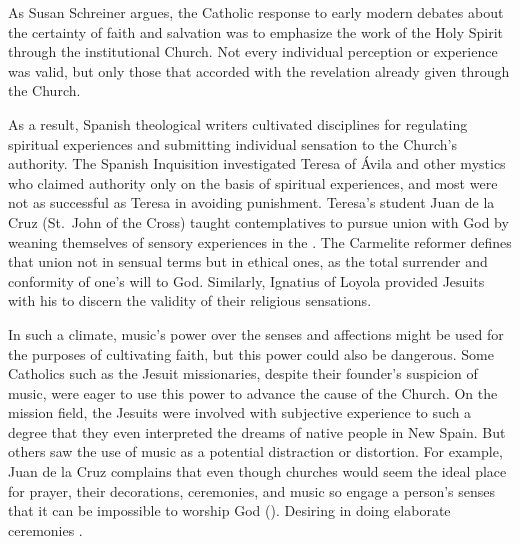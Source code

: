 As Susan Schreiner argues, the Catholic response to early modern debates about the certainty of faith and salvation was to emphasize the work of the Holy Spirit through the institutional Church.%
    \Autocite[131--208]{Schreiner:Certainty}
Not every individual perception or experience was valid, but only those that accorded with the revelation already given through the Church.

As a result, Spanish theological writers cultivated disciplines for regulating spiritual experiences and submitting individual sensation to the Church's authority.
The Spanish Inquisition investigated Teresa of Ávila and other mystics who claimed authority only on the basis of spiritual experiences, and most were not as successful as Teresa in avoiding punishment.
    \Autocites{Ahlgren:TeresaPolitics}{Francisca:Inquisition}
Teresa's student Juan de la Cruz (St.\ John of the Cross) taught contemplatives to pursue union with God by weaning themselves of sensory experiences in the .
The Carmelite reformer defines that union not in sensual terms but in ethical ones, as the total surrender and conformity of one's will to God.%
    \Autocite[bk.~I, ch.~5--7, 226--248]{JuandelaCruz:Subida}
Similarly, Ignatius of Loyola provided Jesuits with his  to discern the validity of their religious sensations.%
    \Autocite[ch.~6]{Schreiner:Certainty}

In such a climate, music's power over the senses and affections might be used for the purposes of cultivating faith, but this power could also be dangerous.
Some Catholics such as the Jesuit missionaries, despite their founder's suspicion of music, were eager to use this power to advance the cause of the Church.
On the mission field, the Jesuits were involved with subjective experience to such a degree that they even interpreted the dreams of native people in New Spain.%
    \Autocite[40--41]{Bailey:Art}
But others saw the use of music as a potential distraction or distortion.
For example, Juan de la Cruz complains that even though churches would seem the ideal place for prayer, their decorations, ceremonies, and music so engage a person's senses that it can be impossible to worship God  ().%
    \Autocite[bk.~3, ch.~39--45, 415--424]{JuandelaCruz:Subida}
Desiring  in doing elaborate ceremonies .%
    \Autocite[bk.~3, ch.~43, 420:
    ]
    {JuandelaCruz:Subida}

